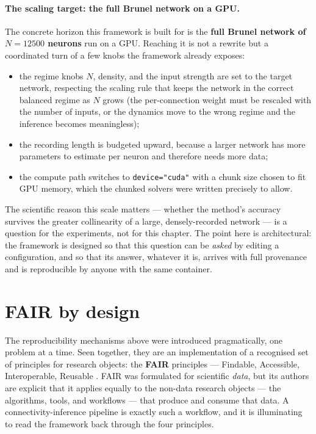 \documentclass[11pt,a4paper]{article}
\newcommand{\code}[1]{\texttt{#1}}
\begin{document}
\paragraph{The scaling target: the full Brunel network on a GPU.}
The concrete horizon this framework is built for is the \textbf{full Brunel network of
$N=12500$ neurons} run on a GPU. Reaching it is not a rewrite but a coordinated turn of a few
knobs the framework already exposes:
\begin{itemize}[leftmargin=1.6em]
  \item the regime knobs $N$, density, and the input strength are set to the target network,
    respecting the scaling rule that keeps the network in the correct balanced regime as $N$
    grows (the per-connection weight must be rescaled with the number of inputs, or the dynamics
    move to the wrong regime and the inference becomes meaningless);
  \item the recording length is budgeted upward, because a larger network has more parameters to
    estimate per neuron and therefore needs more data;
  \item the compute path switches to \code{device="cuda"} with a chunk size chosen to fit GPU
    memory, which the chunked solvers were written precisely to allow.
\end{itemize}
The scientific reason this scale matters --- whether the method's accuracy survives the greater
collinearity of a large, densely-recorded network --- is a question for the experiments, not for
this chapter. The point here is architectural: the framework is designed so that this question
can be \emph{asked} by editing a configuration, and so that its answer, whatever it is, arrives
with full provenance and is reproducible by anyone with the same container.

\section{FAIR by design}
\label{sec:fair}

The reproducibility mechanisms above were introduced pragmatically, one problem at a time. Seen
together, they are an implementation of a recognised set of principles for research objects: the
\textbf{FAIR} principles --- Findable, Accessible, Interoperable, Reusable
\cite{wilkinson2016}. FAIR was formulated for scientific \emph{data}, but its authors are
explicit that it applies equally to the non-data research objects --- the algorithms, tools, and
workflows --- that produce and consume that data. A connectivity-inference pipeline is exactly
such a workflow, and it is illuminating to read the framework back through the four principles.
\end{document}
